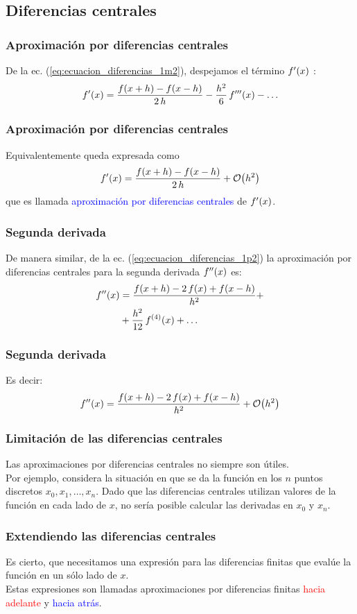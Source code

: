 \subsection{Diferencias centrales}
\begin{frame}
\frametitle{Aproximación por diferencias centrales}
De la ec. (\ref{eq:ecuacion_diferencias_1m2}), despejamos el término ${f}^{\prime}(x)$ :
\begin{align*}
{f}^{\prime}(x) = \dfrac{f(x + h) - f(x - h)}{2 \, h} - \dfrac{h^{2}}{6} \, {f}^{\prime \prime \prime} (x) - \ldots
\end{align*} 
\end{frame}
\begin{frame}
\frametitle{Aproximación por diferencias centrales}
Equivalentemente queda expresada como
\begin{align}
\ptilde{f} (x) = \dfrac{f(x + h) - f(x - h)}{2 \, h} + \order{h^{2}}
\label{eq:ecuacion_5_01}
\end{align}
que es llamada \textcolor{blue}{aproximación por diferencias centrales} de ${f}^{\prime}(x)$.
\end{frame}
\begin{frame}
\frametitle{Segunda derivada}
De manera similar, de la ec. (\ref{eq:ecuacion_diferencias_1p2}) la aproximación por diferencias centrales para la segunda derivada ${f}^{\prime \prime}(x)$ es:
\begin{align*}
{f}^{\prime \prime} (x) &=  \dfrac{f(x + h)- 2 \,  f(x) + f(x - h)}{h^{2}} + \\
&+ \dfrac{h^{2}}{12} \, {f}^{(4)}(x) + \ldots
\end{align*}
\end{frame}
\begin{frame}
\frametitle{Segunda derivada}
Es decir:
\begin{align}
\stilde{f} (x) =  \dfrac{f(x + h) - 2 \, f(x) + f(x - h)}{h^{2}} + \order{h^{2}}
\label{eq:ecuacion_5_02}
\end{align}
\end{frame}
\begin{frame}
\frametitle{Limitación de las diferencias centrales}
Las aproximaciones por diferencias centrales no siempre son útiles.
\\
\bigskip
Por ejemplo, considera la situación en que se da la función en los $n$ puntos discretos $x_{0}, x_{1}, \ldots,x_{n}$.  Dado que las diferencias centrales utilizan valores de la función en cada lado de $x$, no sería posible calcular las derivadas en $x_{0}$ y $x_{n}$.
\end{frame}
\begin{frame}
\frametitle{Extendiendo las diferencias centrales}
Es cierto, que necesitamos una expresión para las diferencias finitas que evalúe la función en un sólo lado de $x$.
\\
\bigskip
Estas expresiones son llamadas aproximaciones por diferencias finitas \textcolor{red}{hacia adelante} y \textcolor{blue}{hacia atrás}.
\end{frame}
